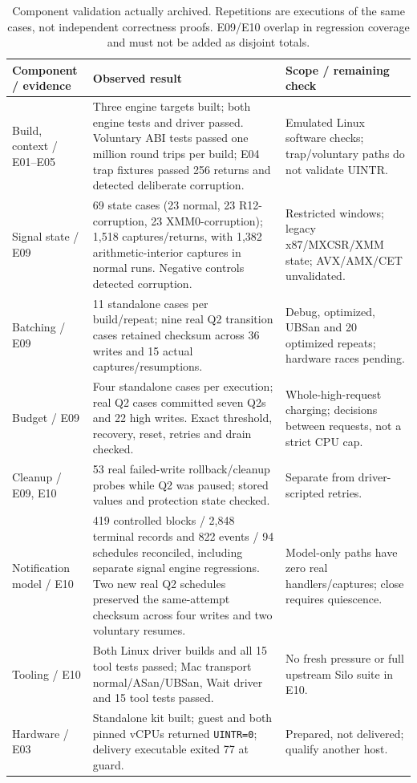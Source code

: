 \documentclass[sigconf,nonacm]{acmart}
\begin{document}
\begin{table}[t]
\caption{Component validation actually archived. Repetitions are executions of
the same cases, not independent correctness proofs. E09/E10 overlap in regression
coverage and must not be added as disjoint totals.}
\label{tab:validation}
\small
\begin{tabular}{p{}p{}p{}}
\toprule
Component / evidence & Observed result & Scope / remaining check \\
\midrule
Build, context / E01--E05 & Three engine targets built; both engine tests and driver passed.
Voluntary ABI tests passed one million round trips per build; E04 trap fixtures passed
256 returns and detected deliberate corruption. & Emulated Linux software checks;
trap/voluntary paths do not validate UINTR. \\
Signal state / E09 & 69 state cases (23 normal, 23 R12-corruption, 23 XMM0-corruption);
1,518 captures/returns, with 1,382 arithmetic-interior captures in normal runs.
Negative controls detected corruption. & Restricted windows; legacy x87/MXCSR/XMM
state; AVX/AMX/CET unvalidated. \\
Batching / E09 & 11 standalone cases per build/repeat; nine real Q2 transition cases
retained checksum across 36 writes and 15 actual captures/resumptions. & Debug,
optimized, UBSan and 20 optimized repeats; hardware races pending. \\
Budget / E09 & Four standalone cases per execution; real Q2 cases committed seven Q2s
and 22 high writes. Exact threshold, recovery, reset, retries and drain checked. &
Whole-high-request charging; decisions between requests, not a strict CPU cap. \\
Cleanup / E09, E10 & 53 real failed-write rollback/cleanup probes while Q2 was paused;
stored values and protection state checked. & Separate from driver-scripted retries. \\
Notification model / E10 & 419 controlled blocks / 2,848 terminal records and 822 events /
94 schedules reconciled, including separate signal engine regressions. Two new real Q2
schedules preserved the same-attempt checksum across four writes and two voluntary resumes. &
Model-only paths have zero real handlers/captures; close requires quiescence. \\
Tooling / E10 & Both Linux driver builds and all 15 tool tests passed; Mac transport
normal/ASan/UBSan, Wait driver and 15 tool tests passed. & No fresh pressure or full upstream
Silo suite in E10. \\
Hardware / E03 & Standalone kit built; guest and both pinned vCPUs returned
\texttt{UINTR=0}; delivery executable exited 77 at guard. & Prepared, not delivered;
qualify another host. \\
\bottomrule
\end{tabular}
\end{table}
\end{document}
